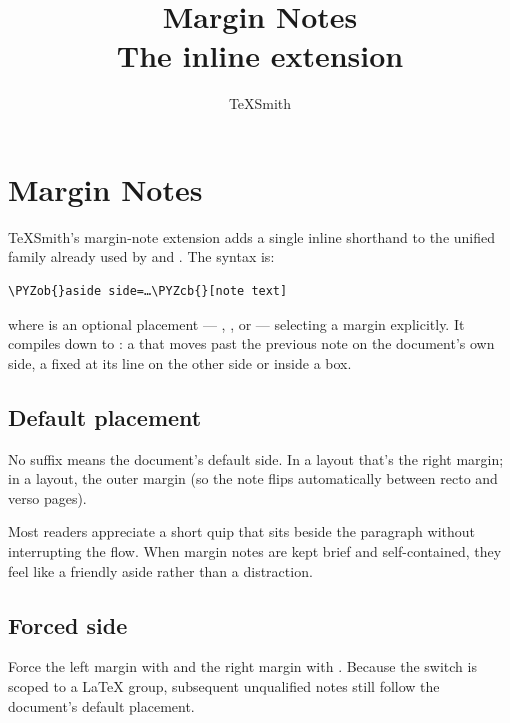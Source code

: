 \documentclass[a4paper,twoside]{article}
\title{Margin Notes\\[0.5em]\large The \tscodeinline{\{aside\}[…]} inline extension}
\author{TeXSmith}\date{}
\begin{document}
\maketitle
\section{Margin Notes}
TeXSmith's margin-note extension adds a single inline shorthand to the
unified  family already used by  and
. The syntax is:
\begin{tscode}[lang=text, engine=pygments]
\begin{Verbatim}[commandchars=\\\{\},breaklines, breakanywhere, commandchars=\\\{\}]
\PYZob{}aside side=…\PYZcb{}[note text]
\end{Verbatim}
\end{tscode}
where  is an optional placement --- , ,  or  ---
selecting a margin explicitly. It compiles down to : a 
that  moves past the previous note on the document's own side, a
 fixed at its line on the other side or inside a box.
\subsection{Default placement}
No suffix means the document's default side. In a  layout that's
the right margin; in a  layout, the outer margin (so the note
flips automatically between recto and verso pages).

Most readers appreciate a short quip that sits
beside the paragraph without interrupting the flow. When margin notes are
kept brief and self-contained, they feel like a friendly aside rather than
a distraction.
\subsection{Forced side}
Force the left margin with  and the right margin with
. Because
the switch is scoped to a \LaTeX{} group, subsequent unqualified notes still
follow the document's default placement.
\end{document}
